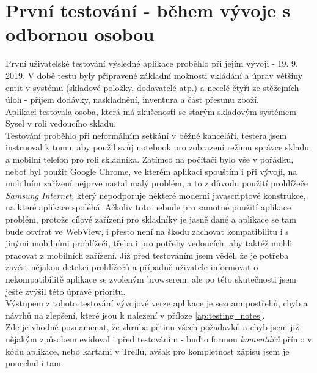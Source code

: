 \section{První testování - během vývoje s odbornou osobou}

První uživatelské testování výsledné aplikace proběhlo při jejím vývoji - 19. 9. 2019. V době testu byly připravené základní možnosti vkládání a úprav většiny entit v systému (skladové položky, dodavatelé atp.) a necelé čtyři ze stěžejních úloh - příjem dodávky, naskladnění, inventura a část přesunu zboží.\\
Aplikaci testovala osoba, která má zkušenosti se starým skladovým systémem Sysel v roli vedoucího skladu.\\
Testování proběhlo při neformálním setkání v běžné kanceláři, testera jsem instruoval k tomu, aby použil svůj notebook pro zobrazení režimu správce skladu a mobilní telefon pro roli skladníka. Zatímco na počítači bylo vše v pořádku, neboť byl použit Google Chrome, ve kterém aplikaci spouštím i při vývoji, na mobilním zařízení nejprve nastal malý problém, a to z důvodu použití prohlížeče \emph{Samsung Internet}, který nepodporuje některé moderní javascriptové konstrukce, na které aplikace spoléhá. Ačkoliv toto nebude pro samotné použití aplikace problém, protože cílové zařízení pro skladníky je jasně dané a aplikace se tam bude otvírat ve WebView, i přesto není na škodu zachovat kompatibilitu i s jinými mobilními prohlížeči, třeba i pro potřeby vedoucích, aby taktéž mohli pracovat z mobilních zařízení. Již před testováním jsem věděl, že je potřeba zavést nějakou detekci prohlížečů a případně uživatele informovat o nekompatibilitě aplikace se zvoleným browserem, ale po této skutečnosti jsem ještě zvýšil této úpravě prioritu.\\
Výstupem z tohoto testování vývojové verze aplikace je seznam postřehů, chyb a návrhů na zlepšení, které jsou k nalezení v příloze \ref{ap:testing_notes}.\\
Zde je vhodné poznamenat, že zhruba pětinu všech požadavků a chyb jsem již nějakým způsobem evidoval i před testováním - buďto formou \emph{ komentářů} přímo v kódu aplikace, nebo kartami v Trellu, avšak pro kompletnost zápisu jsem je ponechal i tam.


